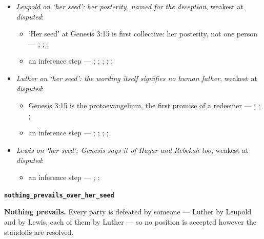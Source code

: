 \documentclass[11pt]{article}
\begin{document}
\begin{itemize}
\item \emph{Leupold on ‘her seed’: her posterity, named for the deception}, weakest at \emph{disputed}:
\begin{itemize}
\item ‘Her seed’ at Genesis 3:15 is first collective: her posterity, not one person --- \cite[167--169]{leupold-exposition-genesis-1942}; \cite[170]{calvin-commentary-genesis-1847}; \cite[101]{keil-delitzsch-pentateuch-1866}; \cite[145--146]{collins-syntactical-note-1997}
\item an inference step --- \cite[169]{leupold-exposition-genesis-1942}; \cite[101--102]{keil-delitzsch-pentateuch-1866}; \cite[170]{calvin-commentary-genesis-1847}; \cite[III.23.7]{irenaeus-against-heresies-180}; \cite[V.21.1]{irenaeus-against-heresies-180}; \cite[ad loc. Gen 3:15]{henry-commentary-whole-bible}
\end{itemize}
\item \emph{Luther on ‘her seed’: the wording itself signifies no human father}, weakest at \emph{disputed}:
\begin{itemize}
\item Genesis 3:15 is the protoevangelium, the first promise of a redeemer --- \cite[167]{leupold-exposition-genesis-1942}; \cite[102]{keil-delitzsch-pentateuch-1866}; \cite{miravalle-meet-your-mother-2014}; \cite[318]{lewis-womans-seed-1991}
\item an inference step --- \cite[298--299]{luther-on-the-creation-1904}; \cite[ad loc. Gen 3:15]{henry-commentary-whole-bible}; \cite[167--169]{leupold-exposition-genesis-1942}; \cite[102]{keil-delitzsch-pentateuch-1866}; \cite[319]{lewis-womans-seed-1991}
\end{itemize}
\item \emph{Lewis on ‘her seed’: Genesis says it of Hagar and Rebekah too}, weakest at \emph{disputed}:
\begin{itemize}
\item an inference step --- \cite[299--300]{lewis-womans-seed-1991}; \cite[319]{lewis-womans-seed-1991}; \cite{akin-woman-seed-serpent-1999}
\end{itemize}
\end{itemize}
\par\medskip\noindent\textbf{\texttt{nothing\_\allowbreak{}prevails\_\allowbreak{}over\_\allowbreak{}her\_\allowbreak{}seed}}\par\nobreak\noindent
\textbf{Nothing prevails.} Every party is defeated by someone — Luther by Leupold and by Lewis, each of them by Luther — so no position is accepted however the standoffs are resolved.
\end{document}
